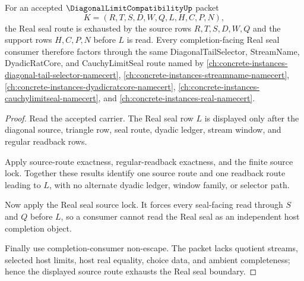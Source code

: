 \begin{theorem}
\label{thm:diagonal-limit-compatibility-real-seal-route-exhaustion}
For an accepted $\DiagonalLimitCompatibilityUp$ packet
$$
K=(R,T,S,D,W,Q,L,H,C,P,N),
$$
the Real seal route is exhausted by the source rows $R,T,S,D,W,Q$ and the support rows $H,C,P,N$ before $L$ is read. Every completion-facing Real seal consumer therefore factors through the same DiagonalTailSelector, StreamName, DyadicRatCore, and CauchyLimitSeal route named by \autoref{ch:concrete-instances-diagonal-tail-selector-namecert}, \autoref{ch:concrete-instances-streamname-namecert}, \autoref{ch:concrete-instances-dyadicratcore-namecert}, \autoref{ch:concrete-instances-cauchylimitseal-namecert}, and \autoref{ch:concrete-instances-real-namecert}.
\end{theorem}
\begin{proof}
Read the accepted carrier. The Real seal row $L$ is displayed only after the diagonal source, triangle row, seal route, dyadic ledger, stream window, and regular readback rows.

Apply source-route exactness, regular-readback exactness, and the finite source lock. Together these results identify one source route and one readback route leading to $L$, with no alternate dyadic ledger, window family, or selector path.

Now apply the Real seal source lock. It forces every seal-facing read through $S$ and $Q$ before $L$, so a consumer cannot read the Real seal as an independent host completion object.

Finally use completion-consumer non-escape. The packet lacks quotient streams, selected host limits, host real equality, choice data, and ambient completeness; hence the displayed source route exhausts the Real seal boundary.
\end{proof}

